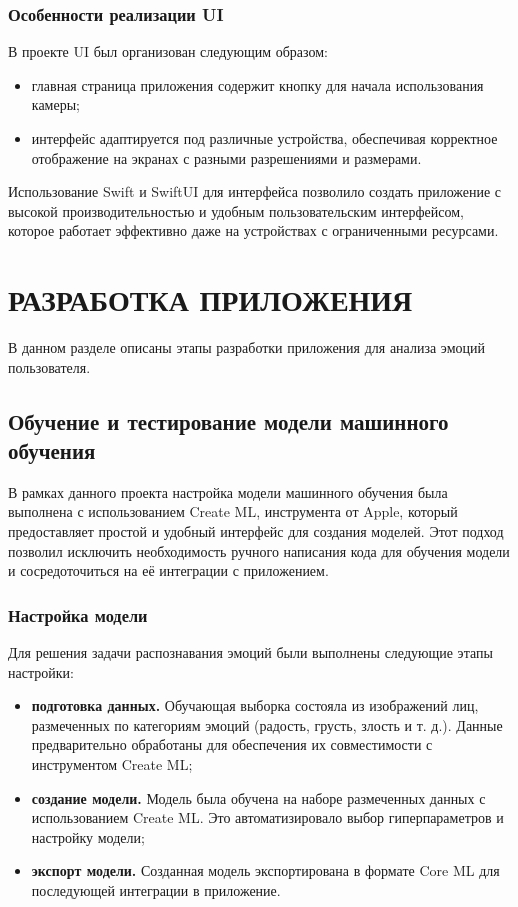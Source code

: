 {\subsubsection*{Особенности реализации UI}
В проекте UI был организован следующим образом:
\begin{itemize}
    \item главная страница приложения содержит кнопку для начала использования камеры;
    \item интерфейс адаптируется под различные устройства, обеспечивая корректное отображение на экранах с разными разрешениями и размерами.
\end{itemize}

Использование Swift и SwiftUI для интерфейса позволило создать приложение с высокой производительностью и удобным пользовательским интерфейсом, которое работает эффективно даже на устройствах с ограниченными ресурсами.

\newpage

\section{\MakeUppercase{Разработка приложения}}
В данном разделе описаны этапы разработки приложения для анализа эмоций пользователя.

\subsection{Обучение и тестирование модели машинного обучения}
{
    В рамках данного проекта настройка модели машинного обучения была выполнена с использованием Create ML, инструмента от Apple, который предоставляет простой и удобный интерфейс для создания моделей. Этот подход позволил исключить необходимость ручного написания кода для обучения модели и сосредоточиться на её интеграции с приложением.

\subsubsection*{Настройка модели}
Для решения задачи распознавания эмоций были выполнены следующие этапы настройки:
\begin{itemize}
    \item \textbf{подготовка данных.} Обучающая выборка состояла из изображений лиц, размеченных по категориям эмоций (радость, грусть, злость и т. д.). Данные предварительно обработаны для обеспечения их совместимости с инструментом Create ML;
    \item \textbf{создание модели.} Модель была обучена на наборе размеченных данных с использованием Create ML. Это автоматизировало выбор гиперпараметров и настройку модели;
    \item \textbf{экспорт модели.} Созданная модель экспортирована в формате Core ML для последующей интеграции в приложение.
\end{itemize}

}}
